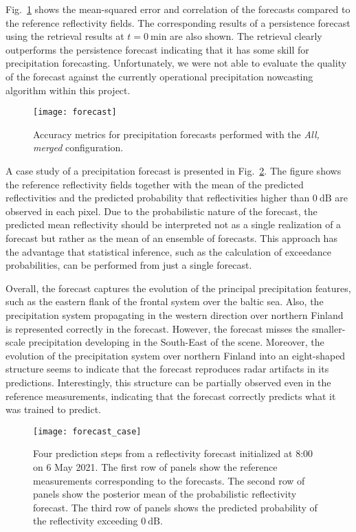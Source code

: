 \documentclass[11pt]{scrartcl}
\begin{document}
 Fig.~\ref{fig:forecast} shows the mean-squared error and correlation of the
 forecasts compared to the reference reflectivity fields. The corresponding
 results of a persistence forecast using the retrieval results at $t =
 \SI{0}{\minute}$ are also shown. The retrieval clearly outperforms the
 persistence forecast indicating that it has some skill for precipitation
 forecasting. Unfortunately, we were not able to evaluate the quality of the
 forecast against the currently operational precipitation nowcasting algorithm
 within this project.


\begin{figure}
  \centering
  \texttt{[image: forecast]}
  \caption{
    Accuracy metrics for precipitation forecasts performed with the \textit{All, merged}
    configuration.
  }
  \label{fig:forecast}
\end{figure}

A case study of a precipitation forecast is presented in
Fig.~\ref{fig:case_forecast}. The figure shows the reference reflectivity fields
together with the mean of the predicted reflectivities and the predicted
probability that  reflectivities higher than $\SI{0}{\deci \bel}$ are observed in
each pixel. Due to the probabilistic nature of the forecast, the predicted mean
reflectivity should be interpreted not as a single realization of a forecast but
rather as the mean of an ensemble of forecasts. This approach has the advantage that
statistical inference, such as the calculation of exceedance probabilities, can
be performed from just a single forecast.


Overall, the forecast captures the evolution of the principal precipitation
features, such as the eastern flank of the frontal system over the baltic sea.
Also, the precipitation system propagating in the western direction over
northern Finland is represented correctly in the forecast. However, the forecast
misses the smaller-scale precipitation developing in the South-East of the
scene. Moreover, the evolution of the precipitation system over northern Finland
into an eight-shaped structure seems to indicate that the forecast reproduces
radar artifacts in its predictions. Interestingly, this structure can be
partially observed even in the reference measurements, indicating that the
forecast correctly predicts what it was trained to predict.


\begin{figure}
  \centering
  \texttt{[image: forecast\_case]}
  \caption{
    Four prediction steps from a reflectivity forecast initialized
    at 8:00 on 6 May 2021. The first row of panels show the reference
    measurements corresponding to the forecasts. The second row
    of panels show the posterior mean of the probabilistic reflectivity
    forecast. The third row of panels shows the predicted probability
    of the reflectivity exceeding $\SI{0}{\deci \bel}$.
  }
  \label{fig:case_forecast}
\end{figure}
\end{document}
